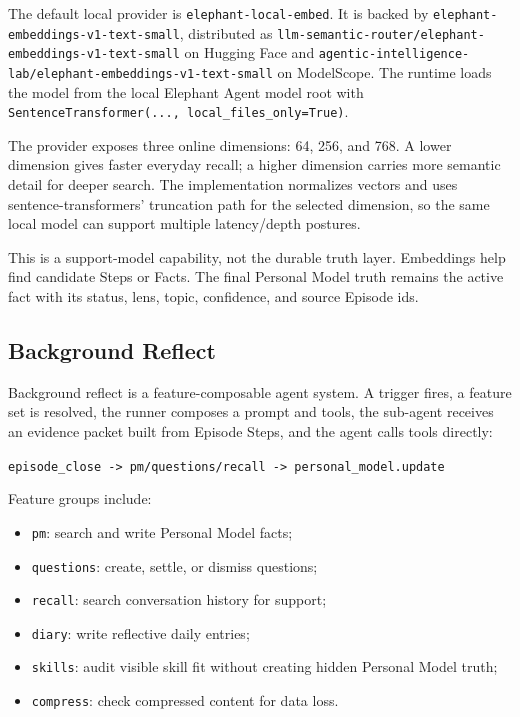 \begin{sloppypar}
The default local provider is \texttt{elephant-local-embed}. It is backed by
\nolinkurl{elephant-embeddings-v1-text-small}, distributed as
\nolinkurl{llm-semantic-router/elephant-embeddings-v1-text-small} on Hugging Face and
\nolinkurl{agentic-intelligence-lab/elephant-embeddings-v1-text-small} on
ModelScope. The runtime loads the model from the local Elephant Agent model root with
\texttt{SentenceTransformer(..., local\_files\_only=True)}.
\end{sloppypar}

The provider exposes three online dimensions: 64, 256, and 768. A lower
dimension gives faster everyday recall; a higher dimension carries more
semantic detail for deeper search. The implementation normalizes vectors and
uses sentence-transformers' truncation path for the selected dimension, so the
same local model can support multiple latency/depth postures.

This is a support-model capability, not the durable truth layer. Embeddings
help find candidate Steps or Facts. The final Personal Model truth remains the
active fact with its status, lens, topic, confidence, and source Episode ids.

\subsection{Background Reflect}

Background reflect is a feature-composable agent system. A trigger fires, a
feature set is resolved, the runner composes a prompt and tools, the sub-agent
receives an evidence packet built from Episode Steps, and the agent calls
tools directly:

\begin{center}
\texttt{episode\_close -> pm/questions/recall -> personal\_model.update}
\end{center}

Feature groups include:

\begin{itemize}[leftmargin=*]
  \item \texttt{pm}: search and write Personal Model facts;
  \item \texttt{questions}: create, settle, or dismiss questions;
  \item \texttt{recall}: search conversation history for support;
  \item \texttt{diary}: write reflective daily entries;
  \item \texttt{skills}: audit visible skill fit without creating hidden
  Personal Model truth;
  \item \texttt{compress}: check compressed content for data loss.
\end{itemize}

